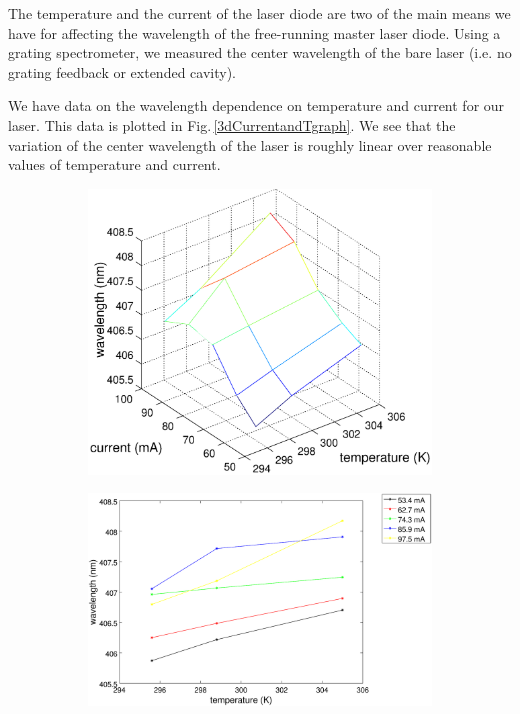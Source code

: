The temperature and the current of the laser diode are two of the main means we have for affecting the wavelength of the free-running master laser diode. Using a grating spectrometer, we measured the center wavelength of the bare laser (i.e. no grating feedback or extended cavity).


We have data on the wavelength dependence on temperature and current for our laser. This data is plotted in Fig.\,\ref{3dCurrentandTgraph}. We see that the variation of the center wavelength of the laser is roughly linear over reasonable values of temperature and current.



\begin{figure}
\centering
\begin{subfigure}[b]{0.55\textwidth}
\includegraphics[width=1\textwidth]{TVlambda3.eps} 
\label{currentandT:sfiga}
\end{subfigure}
\begin{subfigure}[b]{0.40\textwidth}
\includegraphics[width=1\textwidth]{TVlambda2.eps}

\end{subfigure}
\end{figure}
